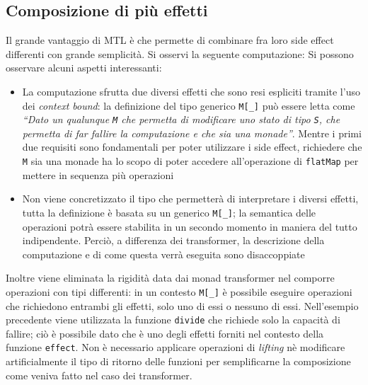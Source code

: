 \subsection{Composizione di più effetti}
\label{sub:composizione-di-piu-effetti}
Il grande vantaggio di MTL è che permette di combinare fra loro side effect differenti con grande semplicità. Si osservi la seguente computazione:
Si possono osservare alcuni aspetti interessanti:
\begin{itemize}
  \item La computazione sfrutta due diversi effetti che sono resi espliciti tramite l'uso dei \emph{context bound}: la definizione del tipo generico \lstinline{M[_]} può essere letta come \emph{``Dato un qualunque \lstinline{M} che permetta di modificare uno stato di tipo \lstinline{S}, che permetta di far fallire la computazione e che sia una monade''}. Mentre i primi due requisiti sono fondamentali per poter utilizzare i side effect, richiedere che \lstinline{M} sia una monade ha lo scopo di poter accedere all'operazione di \lstinline{flatMap} per mettere in sequenza più operazioni
  \item Non viene concretizzato il tipo che permetterà di interpretare i diversi effetti, tutta la definizione è basata su un generico \lstinline{M[_]}; la semantica delle operazioni potrà essere stabilita in un secondo momento in maniera del tutto indipendente. Perciò, a differenza dei transformer, la descrizione della computazione e di come questa verrà eseguita sono disaccoppiate
\end{itemize}

Inoltre viene eliminata la rigidità data dai monad transformer nel comporre operazioni con tipi differenti: in un contesto \lstinline{M[_]} è possibile eseguire operazioni che richiedono entrambi gli effetti, solo uno di essi o nessuno di essi. Nell'esempio precedente viene utilizzata la funzione \lstinline{divide} che richiede solo la capacità di fallire; ciò è possibile dato che è uno degli effetti forniti nel contesto della funzione \lstinline{effect}. Non è necessario applicare operazioni di \emph{lifting} nè modificare artificialmente il tipo di ritorno delle funzioni per semplificarne la composizione come veniva fatto nel caso dei transformer.

